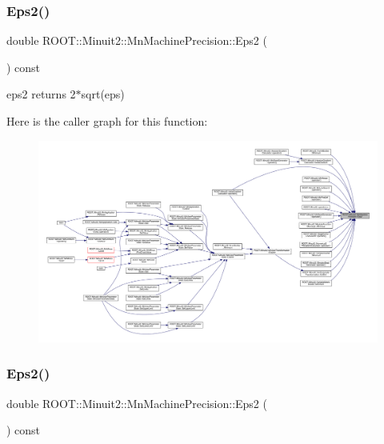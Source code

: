 \subsubsection{\texorpdfstring{Eps2()}{Eps2()}\hspace{0.1cm}{\footnotesize\ttfamily [2/3]}}
{\footnotesize\ttfamily double R\+O\+O\+T\+::\+Minuit2\+::\+Mn\+Machine\+Precision\+::\+Eps2 (\begin{DoxyParamCaption}{ }\end{DoxyParamCaption}) const\hspace{0.3cm}{\ttfamily [inline]}}



eps2 returns 2$\ast$sqrt(eps) 

Here is the caller graph for this function\+:
\nopagebreak
\begin{figure}[H]
\begin{center}
\leavevmode
\includegraphics[width=350pt]{d4/d40/classROOT_1_1Minuit2_1_1MnMachinePrecision_aa71de131bc08f19d18dfeba4cb8191ce_icgraph}
\end{center}
\end{figure}
\mbox{\label{classROOT_1_1Minuit2_1_1MnMachinePrecision_aa71de131bc08f19d18dfeba4cb8191ce}} 
\subsubsection{\texorpdfstring{Eps2()}{Eps2()}\hspace{0.1cm}{\footnotesize\ttfamily [3/3]}}
{\footnotesize\ttfamily double R\+O\+O\+T\+::\+Minuit2\+::\+Mn\+Machine\+Precision\+::\+Eps2 (\begin{DoxyParamCaption}{ }\end{DoxyParamCaption}) const\hspace{0.3cm}{\ttfamily [inline]}}




